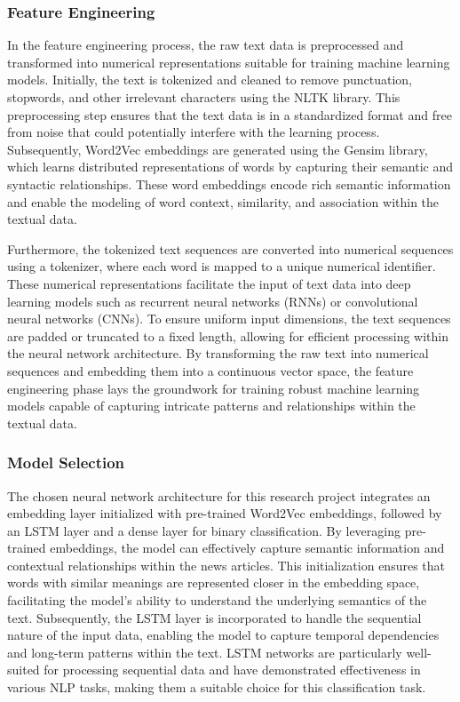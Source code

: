 \subsubsection{{Feature Engineering}}
In the feature engineering process, the raw text data is preprocessed and transformed into numerical representations suitable for training machine learning models. Initially, the text is tokenized and cleaned to remove punctuation, stopwords, and other irrelevant characters using the NLTK library. This preprocessing step ensures that the text data is in a standardized format and free from noise that could potentially interfere with the learning process. Subsequently, Word2Vec embeddings are generated using the Gensim library, which learns distributed representations of words by capturing their semantic and syntactic relationships. These word embeddings encode rich semantic information and enable the modeling of word context, similarity, and association within the textual data.

Furthermore, the tokenized text sequences are converted into numerical sequences using a tokenizer, where each word is mapped to a unique numerical identifier. These numerical representations facilitate the input of text data into deep learning models such as recurrent neural networks (RNNs) or convolutional neural networks (CNNs). To ensure uniform input dimensions, the text sequences are padded or truncated to a fixed length, allowing for efficient processing within the neural network architecture. By transforming the raw text into numerical sequences and embedding them into a continuous vector space, the feature engineering phase lays the groundwork for training robust machine learning models capable of capturing intricate patterns and relationships within the textual data.

\subsubsection{Model Selection}

The chosen neural network architecture for this research project integrates an embedding layer initialized with pre-trained Word2Vec embeddings, followed by an LSTM layer and a dense layer for binary classification. By leveraging pre-trained embeddings, the model can effectively capture semantic information and contextual relationships within the news articles. This initialization ensures that words with similar meanings are represented closer in the embedding space, facilitating the model's ability to understand the underlying semantics of the text. Subsequently, the LSTM layer is incorporated to handle the sequential nature of the input data, enabling the model to capture temporal dependencies and long-term patterns within the text. LSTM networks are particularly well-suited for processing sequential data and have demonstrated effectiveness in various NLP tasks, making them a suitable choice for this classification task.

